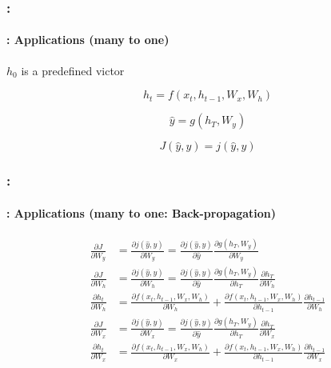 \documentclass[xcolor=table]{beamer}
\begin{document}
\begin{frame}
	\frametitle{\insertshortsubtitle: \insertsection}
	\framesubtitle{\insertsubsection: Applications (many to one)}
	
	\begin{minipage}{0.4\textwidth}
		\begin{center}
			$h_0$ is a predefined victor
		\end{center}
		
		\[ h_t = f(x_t, h_{t-1}, W_x, W_h)\]
		
		\[ \hat{y} = g(h_T, W_y)\]
		
		\[ J(\hat{y}, y) = j(\hat{y}, y)\]	
	\end{minipage}
	\begin{minipage}{0.58\textwidth}
	\end{minipage}

\end{frame}

\begin{frame}
	\frametitle{\insertshortsubtitle: \insertsection}
	\framesubtitle{\insertsubsection: Applications (many to one: Back-propagation)}
	
	\begin{align*}
		\frac{\partial J}{\partial W_y} & = \frac{\partial j(\hat{y}, y)}{\partial W_y}
		= \frac{\partial j(\hat{y}, y)}{\partial \hat{y}} \frac{\partial g(h_T, W_y)}{\partial W_y} \\
		\frac{\partial J}{\partial W_h} & = \frac{\partial j(\hat{y}, y)}{\partial W_h}
		= \frac{\partial j(\hat{y}, y)}{\partial \hat{y}} 
		\frac{\partial g(h_T, W_y)}{\partial h_T} 
		\frac{\partial h_T}{\partial W_h} \\
		\frac{\partial h_t}{\partial W_h} & = 
		\frac{\partial f(x_t, h_{t-1}, W_x, W_h)}{\partial W_h} + 
		\frac{\partial f(x_t, h_{t-1}, W_x, W_h)}{\partial h_{t-1}} \frac{\partial h_{t-1}}{\partial W_h} \\
		\frac{\partial J}{\partial W_x} & = \frac{\partial j(\hat{y}, y)}{\partial W_x}
		= \frac{\partial j(\hat{y}, y)}{\partial \hat{y}} 
		\frac{\partial g(h_T, W_y)}{\partial h_T} 
		\frac{\partial h_T}{\partial W_x} \\
		\frac{\partial h_t}{\partial W_x} & = 
		\frac{\partial f(x_t, h_{t-1}, W_x, W_h)}{\partial W_x} + 
		\frac{\partial f(x_t, h_{t-1}, W_x, W_h)}{\partial h_{t-1}} \frac{\partial h_{t-1}}{\partial W_x} \\
	\end{align*}
	
\end{frame}
\end{document}
